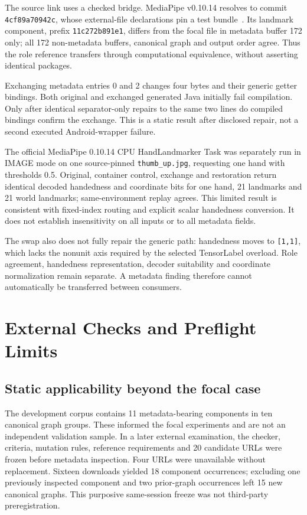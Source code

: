 \documentclass[10pt,conference]{IEEEtran}
\newcommand{\code}[1]{\texttt{#1}}
\begin{document}
The source link uses a checked bridge. MediaPipe v0.10.14 resolves to commit \code{4cf89a70942c}, whose external-file declarations pin a test bundle~\cite{hand-assets}. Its landmark component, prefix \code{11c272b891e1}, differs from the focal file in metadata buffer 172 only; all 172 non-metadata buffers, canonical graph and output order agree. Thus the role reference transfers through computational equivalence, without asserting identical packages.

Exchanging metadata entries 0 and 2 changes four bytes and their generic getter bindings. Both original and exchanged generated Java initially fail compilation. Only after identical separator-only repairs to the same two lines do compiled bindings confirm the exchange. This is a static result after disclosed repair, not a second executed Android-wrapper failure.

The official MediaPipe 0.10.14 CPU HandLandmarker Task was separately run in IMAGE mode on one source-pinned \code{thumb\_up.jpg}, requesting one hand with thresholds 0.5. Original, container control, exchange and restoration return identical decoded handedness and coordinate bits for one hand, 21 landmarks and 21 world landmarks; same-environment replay agrees. This limited result is consistent with fixed-index routing and explicit scalar handedness conversion. It does not establish insensitivity on all inputs or to all metadata fields.

The swap also does not fully repair the generic path: handedness moves to \code{[1,1]}, which lacks the nonunit axis required by the selected TensorLabel overload. Role agreement, handedness representation, decoder suitability and coordinate normalization remain separate. A metadata finding therefore cannot automatically be transferred between consumers.

\section{External Checks and Preflight Limits}
\label{sec:preflight}
\subsection{Static applicability beyond the focal case}
The development corpus contains 11 metadata-bearing components in ten canonical graph groups. These informed the focal experiments and are not an independent validation sample. In a later external examination, the checker, criteria, mutation rules, reference requirements and 20 candidate URLs were frozen before metadata inspection. Four URLs were unavailable without replacement. Sixteen downloads yielded 18 component occurrences; excluding one previously inspected component and two prior-graph occurrences left 15 new canonical graphs. This purposive same-session freeze was not third-party preregistration.
\end{document}
